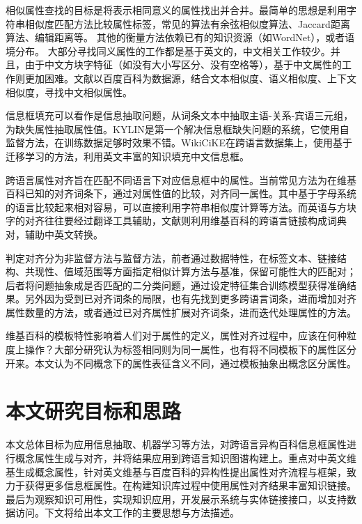 {\heiti 相似属性查找}的目标是将表示相同意义的属性找出并合并。最简单的思想是利用字符串相似度匹配方法比较属性标签，常见的算法有余弦相似度算法、Jaccard距离算法、编辑距离等。
其他的衡量方法依赖已有的知识资源（如WordNet）\cite{yang2005measuring}，或者语境分布\cite{pantel2009web}。
大部分寻找同义属性的工作都是基于英文的，中文相关工作较少。并且，由于中文方块字特征（如没有大小写区分、没有空格等），基于中文属性的工作则更加困难。文献\cite{liu2014extracting}以百度百科为数据源，结合文本相似度、语义相似度、上下文相似度，寻找中文相似属性。

{\heiti 信息框填充}可以看作是信息抽取问题，从词条文本中抽取主语-关系-宾语三元组，为缺失属性抽取属性值。KYLIN\cite{wu2007autonomously}是第一个解决信息框缺失问题的系统，它使用自监督方法，在训练数据足够时效果不错。WikiCiKE\cite{wang2013transfer}在跨语言数据集上，使用基于迁移学习的方法，利用英文丰富的知识填充中文信息框。

{\heiti 跨语言属性对齐}旨在匹配不同语言下对应信息框中的属性。当前常见方法为在维基百科已知的对齐词条下，通过对属性值的比较，对齐同一属性。其中基于字母系统的语言比较起来相对容易，可以直接利用字符串相似度计算等方法\cite{bouma2009cross}。而英语与方块字的对齐往往要经过翻译工具辅助\cite{fu2009cross}，文献\cite{nguyen2011multilingual}则利用维基百科的跨语言链接构成词典对，辅助中英文转换。

判定对齐分为非监督方法与监督方法，前者通过数据特性，在标签文本、链接结构、共现性、值域范围等方面指定相似计算方法与基准，保留可能性大的匹配对\cite{nguyen2011multilingual,lin2011unsupervised}；后者将问题抽象成是否匹配的二分类问题\cite{adar2009information}，通过设定特征集合训练模型获得准确结果。另外因为受到已对齐词条的局限，也有先找到更多跨语言词条，进而增加对齐属性数量的方法\cite{rinser2013cross}，或者通过已对齐属性扩展对齐词条，进而迭代处理属性的方法\cite{nguyen2013slint+}。

维基百科的模板特性影响着人们对于属性的定义，属性对齐过程中，应该在何种粒度上操作？大部分研究认为标签相同则为同一属性\cite{adar2009information,nguyen2011multilingual}，也有将不同模板下的属性区分开来\cite{bouma2009cross}。本文认为不同概念下的属性表征含义不同，通过模板抽象出概念区分属性。

\section{本文研究目标和思路}
本文总体目标为应用信息抽取、机器学习等方法，对跨语言异构百科信息框属性进行概念属性生成与对齐，并将结果应用到跨语言知识图谱构建上。重点对中英文维基生成概念属性，针对英文维基与百度百科的异构性提出属性对齐流程与框架，致力于获得更多信息框属性。在构建知识库过程中使用属性对齐结果丰富知识链接。最后为观察知识可用性，实现知识应用，开发展示系统与实体链接接口，以支持数据访问。下文将给出本文工作的主要思想与方法描述。

